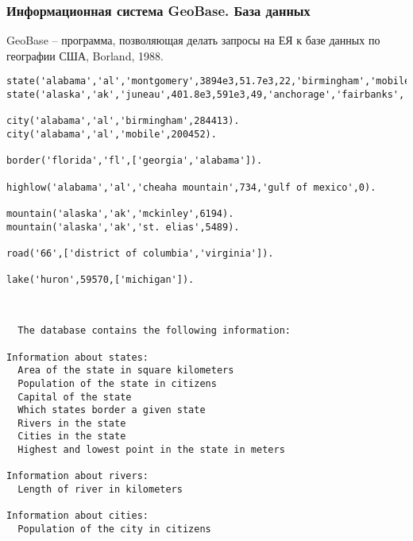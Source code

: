 \documentclass[10pt]{beamer}
\newcommand{\ltprgsize}{\fontsize{5}{5}\selectfont}
\begin{document}



\begin{frame}
  \frametitle{Информационная система GeoBase. База данных}
  GeoBase -- программа, позволяющая делать запросы на ЕЯ к базе данных по географии США, Borland, 1988.
\begin{verbatim}
state('alabama','al','montgomery',3894e3,51.7e3,22,'birmingham','mobile','montgomery','huntsville').
state('alaska','ak','juneau',401.8e3,591e3,49,'anchorage','fairbanks','juneau','sitka').

city('alabama','al','birmingham',284413).
city('alabama','al','mobile',200452).

border('florida','fl',['georgia','alabama']).

highlow('alabama','al','cheaha mountain',734,'gulf of mexico',0).

mountain('alaska','ak','mckinley',6194).
mountain('alaska','ak','st. elias',5489).

road('66',['district of columbia','virginia']).

lake('huron',59570,['michigan']).
\end{verbatim}
  {\ttfamily\ltprgsize
\begin{verbatim}


  The database contains the following information:

Information about states:
  Area of the state in square kilometers
  Population of the state in citizens
  Capital of the state
  Which states border a given state
  Rivers in the state
  Cities in the state
  Highest and lowest point in the state in meters

Information about rivers:
  Length of river in kilometers

Information about cities:
  Population of the city in citizens
\end{verbatim}}
\end{frame}
\end{document}
